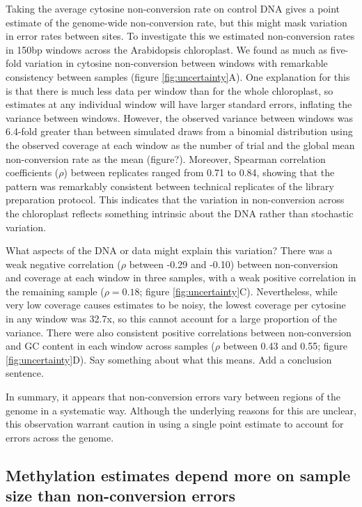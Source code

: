 \documentclass[12pt,longbibliography]{article}
\begin{document}
Taking the average cytosine non-conversion rate on control DNA gives a point estimate of the genome-wide non-conversion rate, but this might mask variation in error rates between sites.
To investigate this we estimated non-conversion rates in 150bp windows across the Arabidopsis chloroplast.
We found as much as five-fold variation in cytosine non-conversion between windows with remarkable consistency between samples (figure \ref{fig:uncertainty}A).
One explanation for this is that there is much less data per window than for the whole chloroplast, so estimates at any individual window will have larger standard errors, inflating the variance between windows.
However, the observed variance between windows was 6.4-fold greater than between simulated draws from a binomial distribution using the observed coverage at each window as the number of trial and the global mean non-conversion rate as the mean (figure?).
Moreover, Spearman correlation coefficients ($\rho$) between replicates ranged from 0.71 to 0.84, showing that the pattern was remarkably consistent between technical replicates of the library preparation protocol.
This indicates that the variation in non-conversion across the chloroplast reflects something intrinsic about the DNA rather than stochastic variation.

What aspects of the DNA or data might explain this variation?
There was a weak negative correlation ($\rho$ between -0.29 and -0.10) between non-conversion and coverage at each window in three samples, with a weak positive correlation in the remaining sample ($\rho = 0.18$; figure \ref{fig:uncertainty}C).
Nevertheless, while very low coverage causes estimates to be noisy, the lowest coverage per cytosine in any window was 32.7x, so this cannot account for a large proportion of the variance.
There were also consistent positive correlations between non-conversion and GC content in each window across samples ($\rho$ between 0.43 and 0.55; figure \ref{fig:uncertainty}D).
Say something about what this means.
Add a conclusion sentence.

In summary, it appears that non-conversion errors vary between regions of the genome in a systematic way. Although the underlying reasons for this are unclear, this observation warrant caution in using a single point estimate to account for errors across the genome.

\subsection{Methylation estimates depend more on sample size than non-conversion errors}
\end{document}
